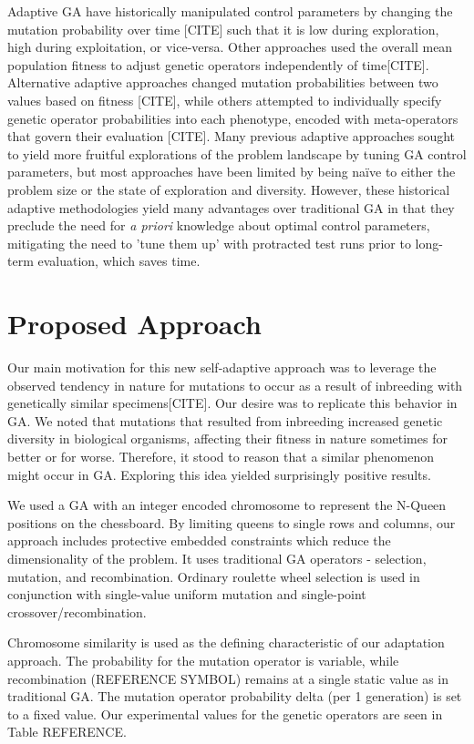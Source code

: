 \documentclass[conference]{IEEEtran}
\begin{document}
Adaptive GA have historically manipulated control parameters by changing the mutation probability over time [CITE] such that it is low during exploration, high during exploitation, or vice-versa. Other approaches used the overall mean population fitness to adjust genetic operators independently of time[CITE]. Alternative adaptive approaches changed mutation probabilities between two values based on fitness [CITE], while others attempted to individually specify genetic operator probabilities into each phenotype, encoded with meta-operators that govern their evaluation [CITE]. Many previous adaptive approaches sought to yield more fruitful explorations of the problem landscape by tuning GA control parameters, but most approaches have been limited by being na\"{i}ve to either the problem size or the state of exploration and diversity. However, these historical adaptive methodologies yield many advantages over traditional GA in that they preclude the need for \textit{a priori} knowledge about optimal control parameters, mitigating the need to 'tune them up' with protracted test runs prior to long-term evaluation, which saves time.

\section{Proposed Approach}\label{params}
Our main motivation for this new self-adaptive approach was to leverage the observed tendency in nature for mutations to occur as a result of inbreeding with genetically similar specimens[CITE]. Our desire was to replicate this behavior in GA. We noted that mutations that resulted from inbreeding increased genetic diversity in biological organisms, affecting their fitness in nature sometimes for better or for worse. Therefore, it stood to reason that a similar phenomenon might occur in GA. Exploring this idea yielded surprisingly positive results.

We used a GA with an integer encoded chromosome to represent the N-Queen positions on the chessboard. By limiting queens to single rows and columns, our approach includes protective embedded constraints which reduce the dimensionality of the problem. It uses traditional GA operators - selection, mutation, and recombination. Ordinary roulette wheel selection is used in conjunction with single-value uniform mutation and single-point crossover/recombination. 

Chromosome similarity is used as the defining characteristic of our adaptation approach. The probability for the mutation operator is variable, while recombination ({REFERENCE SYMBOL}) remains at a single static value as in traditional GA. The mutation operator probability delta (per 1 generation) is set to a fixed value. Our experimental values for the genetic operators are seen in Table {REFERENCE}.
\end{document}
